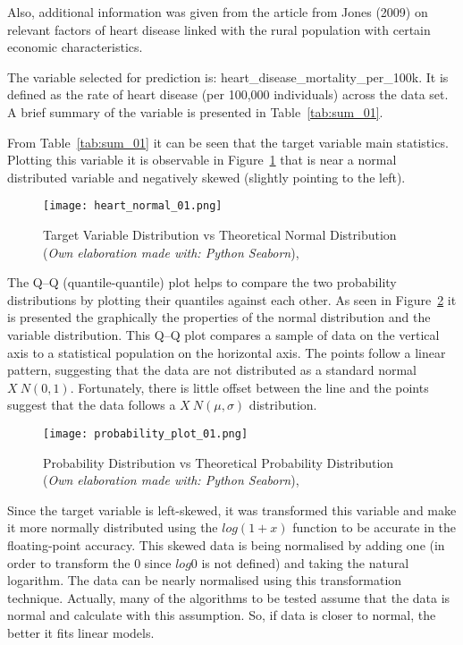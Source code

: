 \documentclass[
10pt, %
a4paper, %
oneside, %
headinclude,footinclude, %
BCOR5mm, %
]{scrartcl}
\begin{document}
Also, additional information was given from the article from Jones (2009) \cite{Jones2009} on relevant factors of heart disease linked with the rural population with certain economic characteristics.

The variable selected for prediction is: heart\_disease\_mortality\_per\_100k. It is defined as the rate of heart disease (per 100,000 individuals) across the data set. A brief summary of the variable is presented in Table~\ref{tab:sum_01}.

\FloatBarrier 


From Table~\ref{tab:sum_01} it can be seen that the target variable main statistics. Plotting this variable it is observable in Figure~\ref{fig:target_01} that is near a normal distributed variable and negatively skewed (slightly pointing to the left).

\FloatBarrier
\begin{figure}[H]
\centering 
\texttt{[image: heart\_normal\_01.png]} 
\caption[Target Variable]{Target Variable Distribution vs Theoretical Normal Distribution (\emph{Own elaboration made with: Python Seaborn}), }
\label{fig:target_01} 
\end{figure}

The Q–Q (quantile-quantile) plot helps to compare the two probability distributions by plotting their quantiles against each other. As seen in Figure~\ref{fig:prob_01} it is presented the graphically the properties of the normal distribution and the variable distribution. This Q–Q plot compares a sample of data on the vertical axis to a statistical population on the horizontal axis. The points follow a linear pattern, suggesting that the data are not distributed as a standard normal $X ~ N(0,1)$. Fortunately, there is little offset between the line and the points suggest that the data follows a $X ~ N(\mu,\sigma)$ distribution. 

\FloatBarrier
\begin{figure}[H]
\centering 
\texttt{[image: probability\_plot\_01.png]} 
\caption[Q-Q Graph]{Probability Distribution vs Theoretical Probability Distribution (\emph{Own elaboration made with: Python Seaborn}), }
\label{fig:prob_01} 
\end{figure}

Since the target variable is left-skewed, it was transformed this variable and make it more normally distributed using the $log(1+x)$ function to be accurate in the floating-point accuracy. This skewed data is being normalised by adding one (in order to transform the 0 since $log 0$ is not defined) and taking the natural logarithm. The data can be nearly normalised using this transformation technique. Actually, many of the algorithms to be tested assume that the data is normal and calculate with this assumption. So, if data is closer to normal, the better it fits linear models.
\end{document}

